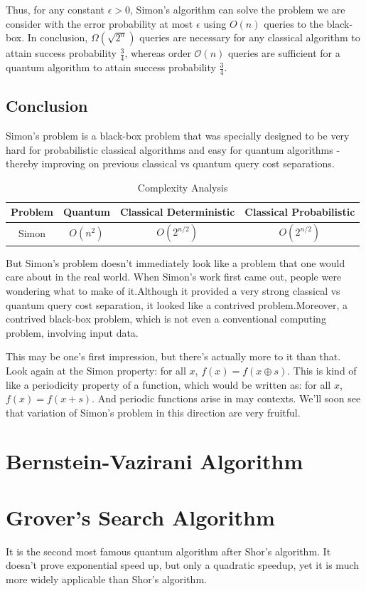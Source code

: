 \documentclass[12pt, oneside]{book}
\theoremstyle{definition}
\theoremstyle{definition}
\theoremstyle{remark}
\begin{document}
Thus, for any constant $\epsilon>0$, Simon's algorithm can solve the problem we are consider with the error probability at most $\epsilon$ using $O(n)$ queries to the black-box. In conclusion, $\Omega(\sqrt{2^n})$ queries are necessary for any classical algorithm to attain success probability $\frac{3}{4}$, whereas order $\mathcal{O}(n)$ queries are sufficient for a quantum algorithm to attain success probability $\frac{3}{4}$.
\section{Conclusion}
Simon's problem is a black-box problem that was specially designed to be very hard for probabilistic classical algorithms and easy for quantum algorithms - thereby improving on previous classical vs quantum query cost separations.

\begin{table}[H]
    \centering
    \begin{tabular}{|c|c|c|c|}
    \hline
        Problem & Quantum & Classical Deterministic & Classical Probabilistic\\
        \hline
         Simon & $O(n^2)$ &$O(2^{n/2})$ &$O(2^{n/2})$\\
         \hline
    \end{tabular}
    \caption{Complexity Analysis}
    \label{tab:simon_complexity}
\end{table}
But Simon's problem doesn't immediately look like a problem that one would care about in the real world. When Simon's work first came out, people were wondering what to make of it.Although it provided a very strong classical vs quantum query cost separation, it looked like a contrived problem.Moreover, a contrived black-box problem, which is not even a conventional computing problem, involving input data.

This may be one's first impression, but there's actually more to it than that. Look again at the Simon property: for all $x$, $f(x)=f(x\oplus s)$. This is kind of like a periodicity property of a function, which would be written as: for all $x$, $f(x)=f(x+s)$. And periodic functions arise in may contexts. We'll soon see that variation of Simon's problem in this direction are very fruitful.


\chapter{Bernstein-Vazirani Algorithm}

\chapter{Grover's Search Algorithm}
It is the second most famous quantum algorithm after Shor's algorithm.
It doesn't prove exponential speed up, but only a quadratic speedup, yet it is much more
widely applicable than Shor's algorithm.
\end{document}
